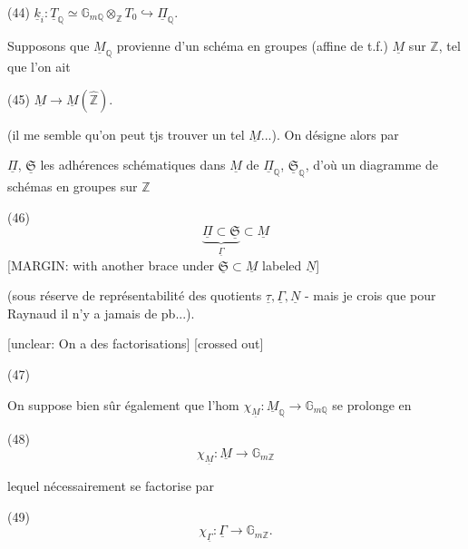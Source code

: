 (44) $\underline{k}_i : \underline{T}_{\mathbb{Q}} \simeq \mathbb{G}_{m\mathbb{Q}} \otimes_{\mathbb{Z}} T_0 \hookrightarrow \underline{\Pi}_{\mathbb{Q}}.$

Supposons que $\underline{M}_{\mathbb{Q}}$ provienne
d'un schéma en groupes (affine de t.f.)
$\underline{M}$ sur $\mathbb{Z}$, tel que l'on ait

(45) $\underline{M} \longrightarrow \underline{M}(\hat{\mathbb{Z}}).$

(il me semble qu'on peut tjs trouver un
tel $\underline{M}$...). On désigne alors par

\newpage


$\underline{\Pi}$, $\underline{\mathfrak{S}}$ les adhérences schématiques
dans $\underline{M}$ de $\underline{\Pi}_\mathbb{Q}$, $\underline{\mathfrak{S}}_\mathbb{Q}$, d'où un diagramme
de schémas en groupes sur $\mathbb{Z}$

(46) $$ \underbrace{\underline{\Pi} \subset \underline{\mathfrak{S}}}_{\underline{\Gamma}} \subset \underline{M} $$
[MARGIN: with another brace under $\underline{\mathfrak{S}} \subset \underline{M}$ labeled $\underline{N}$]

(sous réserve de représentabilité des
quotients $\underline{\tau}, \underline{\Gamma}, \underline{N}$ - mais je crois que
pour Raynaud il n'y a jamais de pb...).

[unclear: On a des factorisations] [crossed out]

(47)

On suppose bien sûr également que
l'hom $\chi_{\underline{M}} : \underline{M}_\mathbb{Q} \to \mathbb{G}_{m \mathbb{Q}}$ se
prolonge en

(48) $$ \chi_{\underline{M}} : \underline{M} \to \mathbb{G}_{m \mathbb{Z}} $$

lequel nécessairement se factorise par

(49) $$ \chi_{\underline{\Gamma}} : \underline{\Gamma} \to \mathbb{G}_{m \mathbb{Z}} . $$

\newpage


